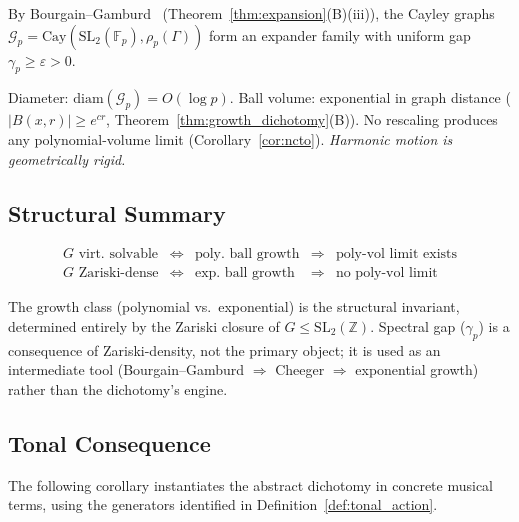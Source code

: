 By Bourgain--Gamburd~\cite{bourgain2008spectral} (Theorem~\ref{thm:expansion}(B)(iii)),
the Cayley graphs $\mathcal{G}_p = \mathrm{Cay}(\mathrm{SL}_2(\mathbb{F}_p), \rho_p(\Gamma))$
form an expander family with uniform gap $\gamma_p \geq \varepsilon > 0$.

Diameter: $\mathrm{diam}(\mathcal{G}_p) = O(\log p)$.
Ball volume: exponential in graph distance ($|B(x,r)| \geq e^{cr}$,
Theorem~\ref{thm:growth_dichotomy}(B)).
No rescaling produces any polynomial-volume limit (Corollary~\ref{cor:ncto}).
\emph{Harmonic motion is geometrically rigid.}

\subsection{Structural Summary}
\label{sec:harmonic:summary}

\[
\renewcommand{\arraystretch}{1.3}
\begin{array}{ccccc}
  G \text{ virt.\ solvable} & \Longleftrightarrow &
  \text{poly.\ ball growth} & \Rightarrow &
  \text{poly-vol limit exists} \\
  G \text{ Zariski-dense} & \Longleftrightarrow &
  \text{exp.\ ball growth} & \Rightarrow &
  \text{no poly-vol limit}
\end{array}
\]

The growth class (polynomial vs.\ exponential) is the structural invariant,
determined entirely by the Zariski closure of $G \leq \mathrm{SL}_2(\mathbb{Z})$.
Spectral gap ($\gamma_p$) is a consequence of Zariski-density, not the primary
object; it is used as an intermediate tool (Bourgain--Gamburd $\Rightarrow$
Cheeger $\Rightarrow$ exponential growth) rather than the dichotomy's engine.

\subsection{Tonal Consequence}
\label{sec:harmonic:tonal}

The following corollary instantiates the abstract dichotomy in concrete musical terms,
using the generators identified in Definition~\ref{def:tonal_action}.

